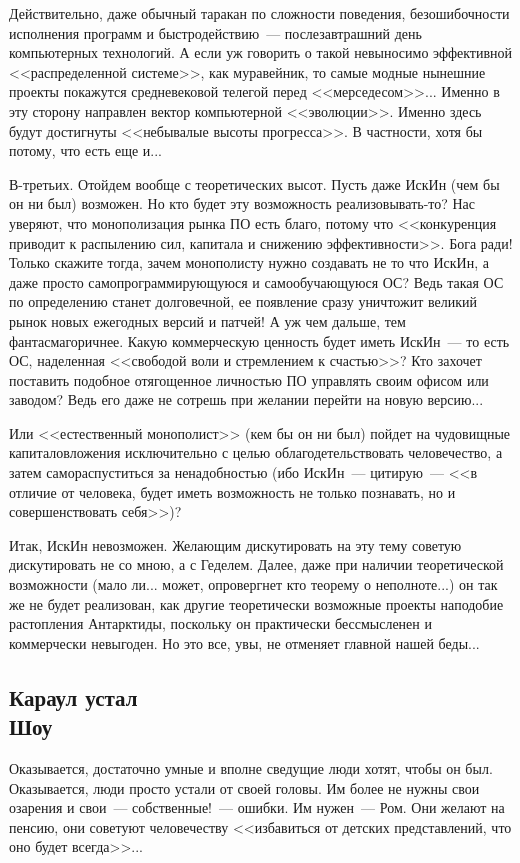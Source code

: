 \documentclass{scrbook}
\newcommand{\flqq}{<<}
\newcommand{\frqq}{>>}
\newcommand{\mdash}{~--- }
\newcommand{\essaysection}[1]{\subsection*{#1}\nopagebreak}
\begin{document}
Действительно, даже обычный таракан по сложности поведения, безошибочности исполнения программ и быстродействию{\mdash}послезавтрашний день компьютерных технологий. А если уж говорить о такой невыносимо эффективной {\flqq}распределенной системе{\frqq}, как муравейник, то самые модные нынешние проекты покажутся средневековой телегой перед {\flqq}мерседесом{\frqq}... Именно в эту сторону направлен вектор компьютерной {\flqq}эволюции{\frqq}. Именно здесь будут достигнуты {\flqq}небывалые высоты прогресса{\frqq}. В частности, хотя бы потому, что есть еще и...

В-третьих. Отойдем вообще с теоретических высот. Пусть даже ИскИн (чем бы он ни был) возможен. Но кто будет эту возможность реализовывать-то? Нас уверяют, что монополизация рынка ПО есть благо, потому что {\flqq}конкуренция приводит к распылению сил, капитала и снижению эффективности{\frqq}. Бога ради! Только скажите тогда, зачем монополисту нужно создавать не то что ИскИн, а даже просто самопрограммирующуюся и самообучающуюся ОС? Ведь такая ОС по определению станет долговечной, ее появление сразу уничтожит великий рынок новых ежегодных версий и патчей! А уж чем дальше, тем фантасмагоричнее. Какую коммерческую ценность будет иметь ИскИн{\mdash}то есть ОС, наделенная {\flqq}свободой воли и стремлением к счастью{\frqq}? Кто захочет поставить подобное отягощенное личностью ПО управлять своим офисом или заводом? Ведь его даже не сотрешь при желании перейти на новую версию...

Или {\flqq}естественный монополист{\frqq} (кем бы он ни был) пойдет на чудовищные капиталовложения исключительно с целью облагодетельствовать человечество, а затем самораспуститься за ненадобностью (ибо ИскИн{\mdash}цитирую{\mdash}{\flqq}в отличие от человека, будет иметь возможность не только познавать, но и совершенствовать себя{\frqq})?

Итак, ИскИн невозможен. Желающим дискутировать на эту тему советую дискутировать не со мною, а с Геделем. Далее, даже при наличии теоретической возможности (мало ли... может, опровергнет кто теорему о неполноте...) он так же не будет реализован, как другие теоретически возможные проекты наподобие растопления Антарктиды, поскольку он практически бессмысленен и коммерчески невыгоден. Но это все, увы, не отменяет главной нашей беды...

\essaysection{Караул устал \\ Шоу}

Оказывается, достаточно умные и вполне сведущие люди хотят, чтобы он был. Оказывается, люди просто устали от своей головы. Им более не нужны свои озарения и свои{\mdash}собственные!{\mdash}ошибки. Им нужен{\mdash}Ром. Они желают на пенсию, они советуют человечеству {\flqq}избавиться от детских представлений, что оно будет всегда{\frqq}...
\end{document}
